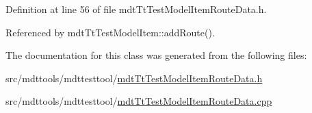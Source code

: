 Definition at line 56 of file mdt\-Tt\-Test\-Model\-Item\-Route\-Data.\-h.



Referenced by mdt\-Tt\-Test\-Model\-Item\-::add\-Route().



The documentation for this class was generated from the following files\-:\begin{DoxyCompactItemize}
\item 
src/mdttools/mdttesttool/\hyperlink{mdt_tt_test_model_item_route_data_8h}{mdt\-Tt\-Test\-Model\-Item\-Route\-Data.\-h}\item 
src/mdttools/mdttesttool/\hyperlink{mdt_tt_test_model_item_route_data_8cpp}{mdt\-Tt\-Test\-Model\-Item\-Route\-Data.\-cpp}\end{DoxyCompactItemize}

